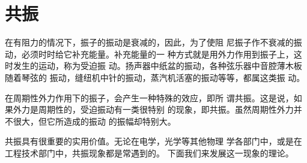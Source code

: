 \section{共振}\label{sec:07.05}

在有阻力的情况下，振子的振动是衰减的，因此，为了使阻
尼振子作不衰减的振动，必须时时给它补充能量。补充能量的一
种方式就是用外力作用到振子上，这时发生的运动，称为受迫振
动。扬声器中纸盆的振动，各种弦乐器中音腔薄木板随着琴弦的
振动，缝纽机中针的振动，蒸汽机活塞的振动等等，都属这类振
动。

在周期性外力作用下的振子，会产生一种特殊的效应，即所
谓共振。这是说，如果外力是周期性的，受迫振动有一类很特别
的现象，即共振。虽然周期性外力并不很大，但它所造成的振动
的振幅却特别大。

共振具有很重要的实用价值。无论在电学，光学等其他物理
学各部门中，或是在工程技术部门中，共振现象都是常遇到的。
下面我们来发展这一现象的理论。


